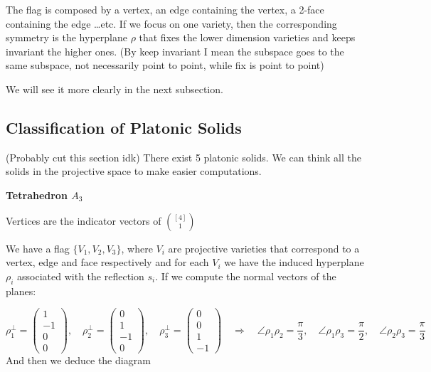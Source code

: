 \documentclass{myclass}
\begin{document}
The flag is composed by a vertex, an edge containing the vertex, a 2-face containing the edge \ldots etc. If we focus on one variety, then the corresponding symmetry is the hyperplane $\rho $ that fixes the lower dimension varieties and keeps invariant the higher ones. (By keep invariant I mean the subspace goes to the same subspace, not necessarily point to point, while fix is point to point)

We will see it more clearly in the next subsection.

\subsection{Classification of Platonic Solids} (Probably cut this section idk)
There exist 5 platonic solids. We can think all the solids in the projective space to make easier computations.

\textbf{Tetrahedron $A_3$}

Vertices are the indicator vectors of $\binom{[4]}{1}$

We have a flag $\{V_1, V_2, V_3\}$, where $V_i$ are projective varieties that correspond to a vertex, edge and face respectively and for each  $V_i$ we have the induced hyperplane $\rho_i $ associated with the reflection $s_i$. If we compute the normal vectors of the planes:

 \[
\rho_1^\perp = \begin{pmatrix} 1\\-1\\0\\0 \end{pmatrix} , \quad
\rho_2^\perp = \begin{pmatrix} 0\\1\\-1\\0 \end{pmatrix} , \quad
\rho_3^\perp = \begin{pmatrix} 0\\0\\1\\-1 \end{pmatrix} \quad
\Rightarrow \quad
\angle \rho_1 \rho _2 = \frac{\pi}{3}, \quad
\angle \rho_1 \rho _3 = \frac{\pi}{2}, \quad
\angle \rho_2 \rho _3 = \frac{\pi}{3}
\] 
And then we deduce the diagram
\end{document}
